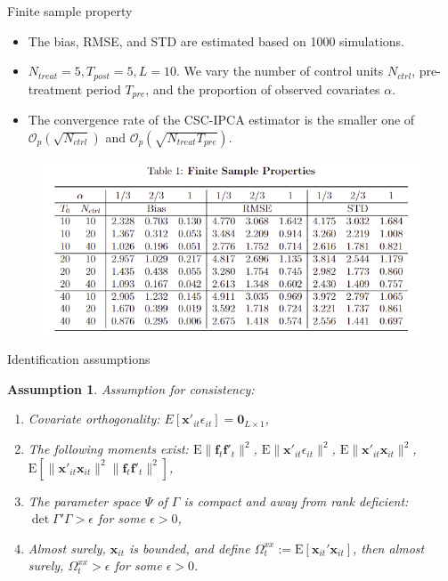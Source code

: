 \documentclass{beamer}
\newtheorem{assumption}{Assumption}
\begin{document}
\begin{frame}{Finite sample property}
\begin{itemize}
    \item The bias, RMSE, and STD are estimated based on 1000 simulations.
    \item $N_{treat} = 5, T_{post}=5, L=10$. We vary the number of control units $N_{ctrl}$, pre-treatment period $T_{pre}$, and the proportion of observed covariates $\alpha$.
    \item The convergence rate of the CSC-IPCA estimator is the smaller one of $\mathcal{O}_p\left(\sqrt{N_{ctrl}}\right)$ and $\mathcal{O}_p\left(\sqrt{N_{treat}T_{pre}}\right)$.
\end{itemize}
\begin{figure}
    \centering
    \includegraphics[scale=0.8]{figs/finite_sample.png}
\end{figure}
\end{frame}

\begin{frame}{Identification assumptions}
\begin{assumption}
Assumption for consistency:
\begin{enumerate}
    \item Covariate orthogonality: $E\left[\textbf{x}'_{it} \epsilon_{it}\right] = \textbf{0}_{L\times 1}$,
    
    \item The following moments exist: $\mathrm{E}\|\boldsymbol{f}_{t}\boldsymbol{f}'_{t}\|^2$, $\mathrm{E}\|\boldsymbol{x}'_{it}\epsilon_{it}\|^2$, $\mathrm{E}\|\boldsymbol{x}'_{it}\boldsymbol{x}_{it}\|^2$, $\mathrm{E}\left[\|\boldsymbol{x}'_{it}\boldsymbol{x}_{it}\|^2\|\boldsymbol{f}_{t}\boldsymbol{f}'_{t}\|^2 \right]$, 
    
    \item The parameter space $\Psi$ of $\Gamma$ is compact and away from rank deficient: $\det{\Gamma' \Gamma} > \epsilon$ for some $\epsilon>0$,
    
    \item Almost surely, $\boldsymbol{x}_{it}$ is bounded, and define $\Omega_t^{xx} := \mathrm{E}\left[ \boldsymbol{x}_{it}' \boldsymbol{x}_{it} \right]$, then almost surely, $\Omega_t^{xx} > \epsilon$ for some $\epsilon > 0$.
\end{enumerate}
\end{assumption}
\end{frame}
\end{document}

